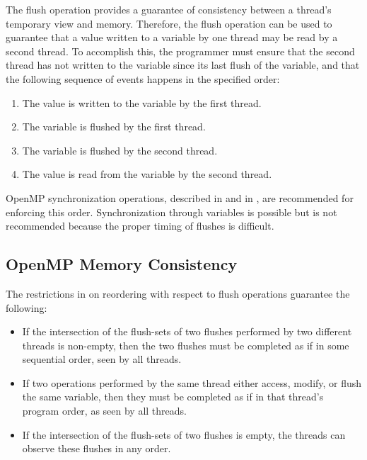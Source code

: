 The flush operation provides a guarantee of consistency between a thread’s temporary
view and memory. Therefore, the flush operation can be used to guarantee that a value 
written to a variable by one thread may be read by a second thread. To accomplish this,
the programmer must ensure that the second thread has not written to the variable since
its last flush of the variable, and that the following sequence of events happens in the
specified order: 

\begin{enumerate}
\item The value is written to the variable by the first thread.   

\item The variable is flushed by the first thread.    

\item The variable is flushed by the second thread.   

\item The value is read from the variable by the second thread.
\end{enumerate}

\begin{note}
OpenMP synchronization operations, described in 
 and in , 
are recommended for enforcing this order. Synchronization 
through variables is possible but is not recommended because the proper timing of 
flushes is difficult.
\end{note}







\subsection{OpenMP Memory Consistency}
\label{subsec:OpenMP Memory Consistency}
The restrictions in  on reordering with respect to flush 
operations guarantee the following: 

\begin{itemize}
\item If the intersection of the flush-sets of two flushes performed by two different threads 
is non-empty, then the two flushes must be completed as if in some sequential order, 
seen by all threads. 

\item If two operations performed by the same thread either access, modify, or flush the 
same variable, then they must be completed as if in that thread's program order, as 
seen by all threads. 

\item If the intersection of the flush-sets of two flushes is empty, the threads can observe 
these flushes in any order.
\end{itemize}

